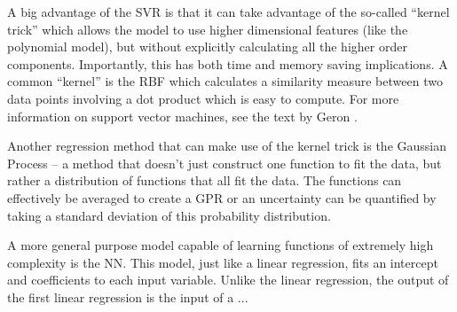 A big advantage of the \gls{SVR} is that it can take advantage of the so-called ``kernel trick'' which allows the model to use higher dimensional features (like the polynomial model), but without explicitly calculating all the higher order components. Importantly, this has both time and memory saving implications. A common ``kernel'' is the \gls{RBF} which calculates a similarity measure between two data points involving a dot product which is easy to compute. For more information on support vector machines, see the text by Geron \cite{Geron_2023_ML}. 

Another regression method that can make use of the kernel trick is the Gaussian Process -- a method that doesn't just construct one function to fit the data, but rather a distribution of functions that all fit the data. The functions can effectively be averaged to create a \gls{GPR} or an uncertainty can be quantified by taking a standard deviation of this probability distribution. 

A more general purpose model capable of learning functions of extremely high complexity is the \gls{NN}. This model, just like a linear regression, fits an intercept and coefficients to each input variable. Unlike the linear regression, the output of the first linear regression is the input of a  ...
